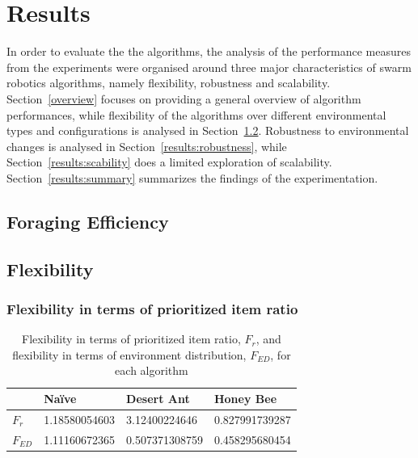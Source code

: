 \chapter{Results}
\label{chap:results}



In order to evaluate the the algorithms, the analysis of the performance measures from the experiments were organised around three major characteristics of swarm robotics algorithms, namely flexibility, robustness and scalability. Section~\ref{overview} focuses on providing a general overview of algorithm performances, while flexibility of the algorithms over different environmental types and configurations is analysed in Section~\ref{results:flexibility}. Robustness to environmental changes is analysed in Section~\ref{results:robustness}, while Section~\ref{results:scability} does a limited exploration of scalability. Section~\ref{results:summary} summarizes the findings of the experimentation. 

\section{Foraging Efficiency}
\label{results:efficiency}





\section{Flexibility}
\label{results:flexibility}



\subsection{Flexibility in terms of prioritized item ratio}
\label{results:prioritizeditemratio}

\begin{table}[]
\centering
\caption{Flexibility in terms of prioritized item ratio, $F_r$, and flexibility in terms of environment distribution, $F_{ED}$, for each algorithm}
\label{table:flexibility}
\begin{tabular}{@{}llll@{}}
\toprule
\textbf{}         & Na\"ive         & Desert Ant        & Honey Bee         \\ \midrule
\textbf{$F_r$}    & 1.18580054603 & 3.12400224646     & 0.827991739287    \\ \midrule
\textbf{$F_{ED}$} & 1.11160672365 & 0.507371308759 & 0.458295680454 
\end{tabular}
\end{table}


